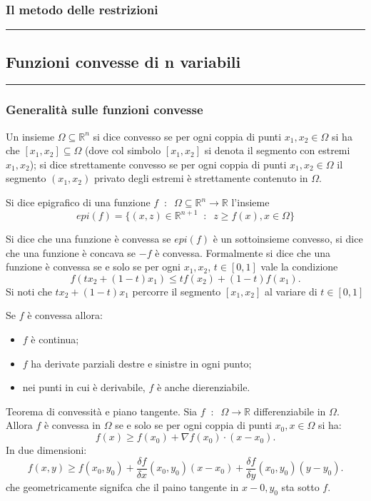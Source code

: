 \subsubsection*{Il metodo delle restrizioni}

\rule{\textwidth}{2pt}
\subsection*{Funzioni convesse di n variabili}
\rule{\textwidth}{0.4pt}
\subsubsection*{Generalità sulle funzioni convesse}
Un insieme $\Omega \subseteq \mathbb{R}^n$ si dice convesso se per ogni coppia di punti $x_1, x_2 \in \Omega$ si ha che $[x_1,x_2]\subseteq \Omega$ (dove col simbolo $[x_1,x_2]$ si denota il segmento con estremi $x_1,x_2$); si dice strettamente convesso se per ogni coppia di punti $x_1,x_2 \in \Omega$ il segmento $(x_1,x_2)$ privato degli estremi è strettamente contenuto in $\Omega$.\newline

Si dice epigrafico di una funzione $f \;\;:\;\; \Omega \subseteq \mathbb{R}^n \rightarrow  \mathbb{R}$ l'insieme
\[
    epi(f)=\{(x,z) \in \mathbb{R}^{n+1} \;\;:\;\; z\geq f(x), x \in\Omega\}
\]
\newline

Si dice che una funzione è convessa se $epi(f)$ è un sottoinsieme convesso, si dice che una funzione è concava se $-f$ è convessa.\newline
Formalmente si dice che una funzione è convessa se e solo se per ogni $x_1,x_2$, $t \in [0,1]$ vale la condizione
\[
    f(tx_2 + (1-t)x_1) \leq tf(x_2) + (1-t)f(x_1).
\]
Si noti che $tx_2 + (1-t)x_1$ percorre il segmento $[x_1,x_2]$ al variare di $t \in[0,1]$\newline

Se $f$ è convessa allora:
\begin{itemize}
    \item $f$ è continua;
    \item $f$ ha derivate parziali destre e sinistre in ogni punto;
    \item nei punti in cui è derivabile, $f$ è anche dierenziabile.
\end{itemize}

Teorema di convessità e piano tangente. Sia $f \;\;:\;\; \Omega \rightarrow \mathbb{R}$ differenziabile in $\Omega$. Allora $f$ è convessa in $\Omega$ se e solo se per ogni coppia di punti $x_0, x \in \Omega$ si ha:
\[
    f(x) \geq f(x_0) + \nabla f(x_0) \cdot (x-x_0).
\]
In due dimensioni:
\[
    f(x,y) \geq f(x_0,y_0) + \frac{\delta f}{\delta x}(x_0,y_0)(x-x_0)+\frac{\delta f}{\delta y}(x_0, y_0)(y-y_0).
\]
che geometricamente signifca che il paino tangente in $x-0, y_0$ sta sotto $f$.\newline

